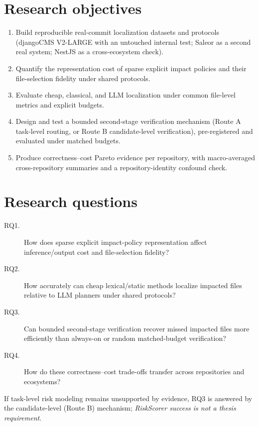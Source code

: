 \documentclass[11pt,a4paper]{article}
\begin{document}
\section{Research objectives}
\label{sec:objectives}

\begin{enumerate}
  \item Build reproducible real-commit localization datasets and protocols
        (djangoCMS V2-LARGE with an untouched internal test; Saleor as a second
        real system; NestJS as a cross-ecosystem check).
  \item Quantify the representation cost of sparse explicit impact policies and
        their file-selection fidelity under shared protocols.
  \item Evaluate cheap, classical, and LLM localization under common
        file-level metrics and explicit budgets.
  \item Design and test a bounded second-stage verification mechanism
        (Route A task-level routing, or Route B candidate-level verification),
        pre-registered and evaluated under matched budgets.
  \item Produce correctness--cost Pareto evidence per repository, with
        macro-averaged cross-repository summaries and a repository-identity
        confound check.
\end{enumerate}

\section{Research questions}
\label{sec:rq}

\begin{description}
  \item[RQ1.] How does sparse explicit impact-policy representation affect
  inference/output cost and file-selection fidelity?
  \item[RQ2.] How accurately can cheap lexical/static methods localize impacted
  files relative to LLM planners under shared protocols?
  \item[RQ3.] Can bounded second-stage verification recover missed impacted
  files more efficiently than always-on or random matched-budget verification?
  \item[RQ4.] How do these correctness--cost trade-offs transfer across
  repositories and ecosystems?
\end{description}

If task-level risk modeling remains unsupported by evidence, RQ3 is answered
by the candidate-level (Route B) mechanism; \emph{RiskScorer success is not a
thesis requirement}.
\end{document}
